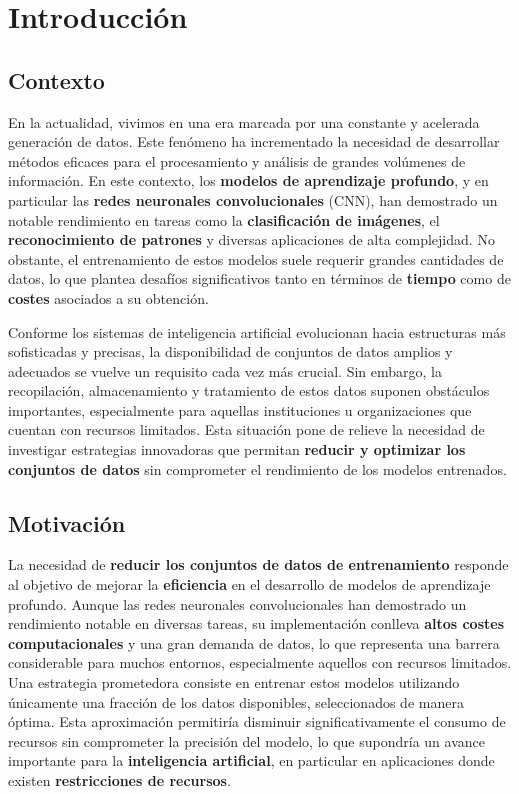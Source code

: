 
\chapter{Introducción}\label{ch:introduccion}

\section{Contexto}\label{sec:contexto}
En la actualidad, vivimos en una era marcada por una constante y acelerada generación de datos.
Este fenómeno ha incrementado la necesidad de desarrollar métodos eficaces para el procesamiento y análisis de grandes
volúmenes de información.
En este contexto, los \textbf{modelos de aprendizaje profundo}, y en particular las
\textbf{redes neuronales convolucionales} (CNN), han demostrado un notable rendimiento en tareas como la
\textbf{clasificación de imágenes}, el \textbf{reconocimiento de patrones} y diversas aplicaciones de alta complejidad.
No obstante, el entrenamiento de estos modelos suele requerir grandes cantidades de datos, lo que plantea desafíos
significativos tanto en términos de \textbf{tiempo} como de \textbf{costes} asociados a su obtención.



Conforme los sistemas de inteligencia artificial evolucionan hacia estructuras más sofisticadas y precisas, la
disponibilidad de conjuntos de datos amplios y adecuados se vuelve un requisito cada vez más crucial.
Sin embargo, la recopilación, almacenamiento y tratamiento de estos datos suponen obstáculos importantes, especialmente
para aquellas instituciones u organizaciones que cuentan con recursos limitados.
Esta situación pone de relieve la necesidad de investigar estrategias innovadoras que permitan
\textbf{reducir y optimizar los conjuntos de datos} sin comprometer el rendimiento de los modelos entrenados.


\section{Motivación}\label{sec:motivacion}
La necesidad de \textbf{reducir los conjuntos de datos de entrenamiento} responde al objetivo de mejorar la
\textbf{eficiencia} en el desarrollo de modelos de aprendizaje profundo.
Aunque las redes neuronales convolucionales han demostrado un rendimiento notable en diversas tareas, su implementación
conlleva \textbf{altos costes computacionales} y una gran demanda de datos, lo que representa una barrera considerable
para muchos entornos, especialmente aquellos con recursos limitados.
Una estrategia prometedora consiste en entrenar estos modelos utilizando únicamente una fracción de los datos
disponibles, seleccionados de manera óptima.
Esta aproximación permitiría disminuir significativamente el consumo de recursos sin comprometer la precisión del
modelo, lo que supondría un avance importante para la \textbf{inteligencia artificial}, en particular en aplicaciones
donde existen \textbf{restricciones de recursos}.


